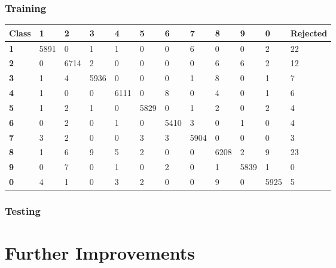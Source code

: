 \documentclass[
  a4paper,            %
  DIV=10,             %
  oneside,            %
  BCOR=5mm,           %
  parskip=half,       %
  numbers=noenddot,   %
  bibtotoc,           %
  listof=totoc        %
]{scrreprt}
\let\oldchapter\chapter
\renewcommand{\chapter}{\par\oldchapter}
\begin{document}
\subsection{Training}
\begin{center}
  \begin{tabular}{|p{1cm}|p{1cm}|p{1cm}|p{1cm}|p{1cm}|p{1cm}|p{1cm}|p{1cm}|p{1cm}|p{1cm}|p{1cm}|p{1.7cm}|}
    \hline
    \textbf{Class} & \textbf{1} & \textbf{2} & \textbf{3} & \textbf{4} & \textbf{5} & \textbf{6} & \textbf{7} & \textbf{8} & \textbf{9} & \textbf{0} & \textbf{Rejected} \\
    \hline
    \textbf{1} & 5891 & 0 & 1 & 1 & 0 & 0 & 6 & 0 & 0 & 2 & 22 \\
    \hline
    \textbf{2} & 0 & 6714 & 2 & 0 & 0 & 0 & 0 & 6 & 6 & 2 & 12 \\
    \hline
    \textbf{3} & 1 & 4 & 5936 & 0 & 0 & 0 & 1 & 8 & 0 & 1 & 7 \\
    \hline
    \textbf{4} & 1 & 0 & 0 & 6111 & 0 & 8 & 0 & 4 & 0 & 1 & 6 \\
    \hline
    \textbf{5} & 1 & 2 & 1 & 0 & 5829 & 0 & 1 & 2 & 0 & 2 & 4 \\
    \hline
    \textbf{6} & 0 & 2 & 0 & 1 & 0 & 5410 & 3 & 0 & 1 & 0 & 4 \\
    \hline
    \textbf{7} & 3 & 2 & 0 & 0 & 3 & 3 & 5904 & 0 & 0 & 0 & 3 \\
    \hline
    \textbf{8} & 1 & 6 & 9 & 5 & 2 & 0 & 0 & 6208 & 2 & 9 & 23 \\
    \hline
    \textbf{9} & 0 & 7 & 0 & 1 & 0 & 2 & 0 & 1 & 5839 & 1 & 0 \\
    \hline
    \textbf{0} & 4 & 1 & 0 & 3 & 2 & 0 & 0 & 9 & 0 & 5925 & 5 \\
    \hline
  \end{tabular}
\end{center}
\subsection{Testing}

\chapter{Further Improvements}
\end{document}
